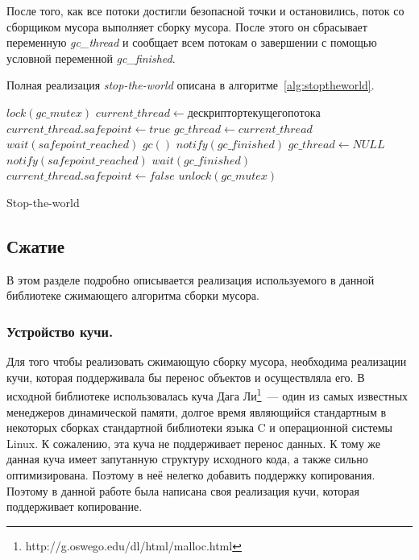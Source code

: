 После того, как все потоки достигли безопасной точки и остановились, поток со сборщиком мусора выполняет сборку мусора. После этого он сбрасывает переменную \textit{gc\_thread} и сообщает всем потокам о завершении с помощью условной переменной \textit{gc\_finished}.

Полная реализация \textit{stop-the-world} описана в алгоритме~\ref{alg:stoptheworld}.

\begin{algorithm}[h]
\begin{algorithmic}[1]
\State $lock(gc\_mutex)$
\State $current\_thread \gets дескриптор текущего потока$ 
\State $current\_thread.safepoint \gets true$
    \State $gc\_thread \gets current\_thread$
            \State $wait(safepoint\_reached)$
        \EndIf
    \EndFor
    \State $gc()$
    \State $notify(gc\_finished)$
    \State $gc\_thread \gets NULL$
\Else
    \State $notify(safepoint\_reached)$
    \State $wait(gc\_finished)$
\EndIf
\State $current\_thread.safepoint \gets false$
\State $unlock(gc\_mutex)$
\end{algorithmic}
\caption{Stop-the-world}\label{alg:stoptheworld}
\end{algorithm}
\subsection{Сжатие}
В этом разделе подробно описывается реализация используемого в данной библиотеке сжимающего алгоритма сборки мусора.
\subsubsection{Устройство кучи.}
Для того чтобы реализовать сжимающую сборку мусора, необходима реализации кучи, которая поддерживала бы перенос объектов и осуществляла его. В исходной библиотеке использовалась куча Дага Ли\footnote{http://g.oswego.edu/dl/html/malloc.html}~--- один из самых известных менеджеров динамической памяти, долгое время являющийся стандартным в некоторых сборках стандартной библиотеки языка C и операционной системы Linux. К сожалению, эта куча не поддерживает перенос данных. К тому же данная куча имеет запутанную структуру исходного кода, а также сильно оптимизирована. Поэтому в неё нелегко добавить поддержку копирования. Поэтому в данной работе была написана своя реализация кучи, которая поддерживает копирование.

